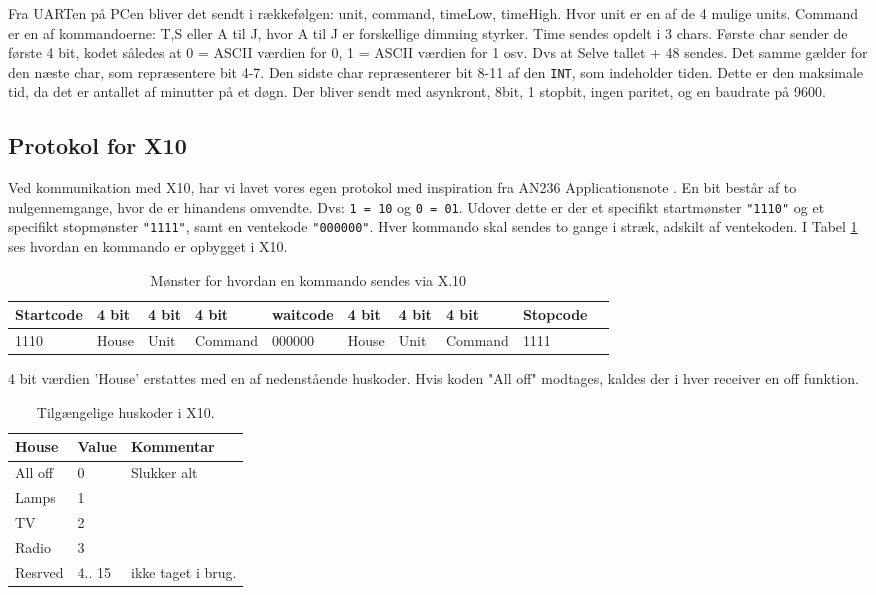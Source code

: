 Fra UARTen på PCen bliver det sendt i rækkefølgen: unit, command, timeLow, timeHigh. Hvor unit er en af de 4 mulige units. Command er en af kommandoerne: T,S eller A til J, hvor A til J er forskellige dimming styrker.
Time sendes opdelt i 3 chars. Første char sender de første 4 bit, kodet således at 0 = ASCII værdien for 0, 1 = ASCII værdien for 1 osv. Dvs at Selve tallet + 48 sendes. Det samme gælder for den næste char, som repræsentere bit 4-7. Den sidste char repræsenterer bit 8-11 af den \texttt{INT}, som indeholder tiden. Dette er den maksimale tid, da det er antallet af minutter på et døgn.
Der bliver sendt med asynkront, 8bit, 1 stopbit, ingen paritet, og en baudrate på 9600.

\clearpage

\subsection{Protokol for X10}\label{prot_x10}

Ved kommunikation med X10, har vi lavet vores egen protokol med inspiration fra AN236 Applicationsnote \cite{lib:AN236}. En bit består af to nulgennemgange, hvor de er hinandens omvendte. Dvs: \texttt{1 = 10} og \texttt{0 = 01}. Udover dette er der et specifikt startmønster \texttt{"1110"} og et specifikt stopmønster \texttt{"1111"}, samt en ventekode \texttt{"000000"}. Hver kommando skal sendes to gange i stræk, adskilt af ventekoden. I Tabel \ref{tbl:x.10pattern} ses hvordan en kommando er opbygget i X10.

\begin{table} [h]
	\centering
    \begin{tabular}{|l|l|l|l|l|l|l|l|l|l|}
    \hline    
    Startcode & 4 bit & 4 bit & 4 bit & waitcode &  4 bit & 4 bit & 4 bit & Stopcode\\ \hline
    1110            & House & Unit & Command & 000000  &   House & Unit  & Command & 1111 \\ \hline
    \end{tabular}
\caption{Mønster for hvordan en kommando sendes via X.10}
\label{tbl:x.10pattern}
\end{table}

4 bit værdien 'House' erstattes med en af nedenstående huskoder. Hvis koden "All off" modtages, kaldes der i hver receiver en off funktion.

\begin{table} [h]
\centering
    \begin{tabular}{|l|l|l|}
    \hline
    House & Value  & Kommentar          \\ \hline
    All off & 0      & Slukker alt        \\ \hline
    Lamps   & 1      & ~                  \\ \hline
    TV      & 2      & ~                  \\ \hline
    Radio   & 3      & ~                  \\ \hline
    Resrved & 4.. 15 & ikke taget i brug. \\ \hline
    \end{tabular}
\caption{Tilgængelige huskoder i X10.}
\end{table}

